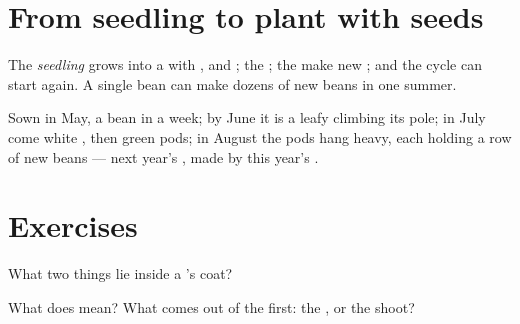 \section{From seedling to plant with seeds}

\begin{proposition}\label{prop:g2:from-seed-to-plant:cycle}
The \emph{seedling} grows into a  with ,
 and ; the  ; the  make new
\emph{}; and the cycle can start again. A single bean 
can make dozens of new beans in one summer.
\end{proposition}
\admitted

\begin{example}\label{ex:g2:from-seed-to-plant:summer}
Sown in May, a bean  in a week; by June it is a leafy
 climbing its pole; in July come white , then green
pods; in August the pods hang heavy, each holding a row of new
beans --- next year's , made by this year's .
\end{example}

\section{Exercises}

\begin{exercise}[$\star$]\label{exo:g2:from-seed-to-plant:1}
What two things lie inside a 's coat?
\end{exercise}

\begin{exercise}[$\star$]\label{exo:g2:from-seed-to-plant:2}
What does \emph{} mean? What comes out of the 
first: the , or the shoot?
\end{exercise}

